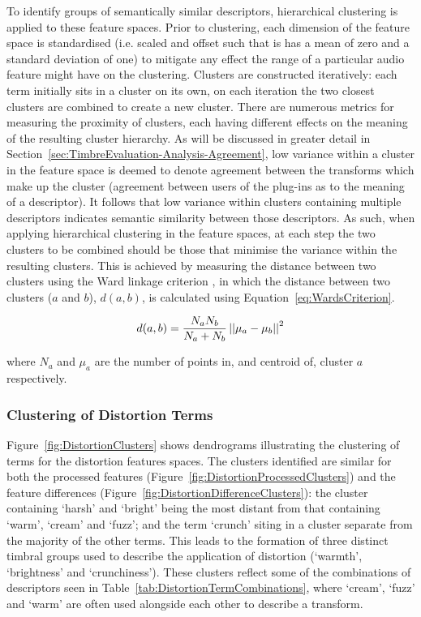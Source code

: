 		To identify groups of semantically similar descriptors, hierarchical clustering is applied to these feature
		spaces. Prior to clustering, each dimension of the feature space is standardised (i.e. scaled and offset
		such that is has a mean of zero and a standard deviation of one) to mitigate any effect the range of a
		particular audio feature might have on the clustering. Clusters are constructed iteratively: each term
		initially sits in a cluster on its own, on each iteration the two closest clusters are combined to create a
		new cluster. There are numerous metrics for measuring the proximity of clusters, each having different
		effects on the meaning of the resulting cluster hierarchy. As will be discussed in greater detail in
		Section~\ref{sec:TimbreEvaluation-Analysis-Agreement}, low variance within a cluster in the feature space
		is deemed to denote agreement between the transforms which make up the cluster (agreement between users of
		the plug-ins as to the meaning of a descriptor). It follows that low variance within clusters containing
		multiple descriptors indicates semantic similarity between those descriptors. As such, when applying
		hierarchical clustering in the feature spaces, at each step the two clusters to be combined should be those
		that minimise the variance within the resulting clusters. This is achieved by measuring the distance
		between two clusters using the Ward linkage criterion \citep{ward1963hierarchical}, in which the distance
		between two clusters ($a$ and $b$), $d(a, b)$, is calculated using Equation~\ref{eq:WardsCriterion}.

		\begin{equation}
			d(a, b) = \frac{N_{a}N_{b}}{N_{a} + N_{b}} \left|\left|\mu_{a} - \mu_{b}\right|\right|^{2}
			\label{eq:WardsCriterion}
		\end{equation}

		where $N_{a}$ and $\mu_{a}$ are the number of points in, and centroid of, cluster $a$ respectively.

		\subsubsection*{Clustering of Distortion Terms}
			Figure~\ref{fig:DistortionClusters} shows dendrograms illustrating the clustering of terms for the
			distortion features spaces. The clusters identified are similar for both the processed features
			(Figure~\ref{fig:DistortionProcessedClusters}) and the feature differences
			(Figure~\ref{fig:DistortionDifferenceClusters}): the cluster containing `harsh' and `bright' being
			the most distant from that containing `warm', `cream' and `fuzz'; and the term `crunch' siting in a
			cluster separate from the majority of the other terms. This leads to the formation of three
			distinct timbral groups used to describe the application of distortion (`warmth', `brightness' and
			`crunchiness'). These clusters reflect some of the combinations of descriptors seen in
			Table~\ref{tab:DistortionTermCombinations}, where `cream', `fuzz' and `warm' are often used
			alongside each other to describe a transform.

